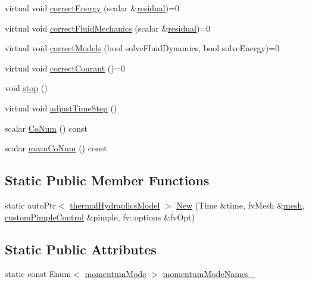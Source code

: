 \begin{DoxyCompactItemize}
\item 
virtual void \hyperlink{classFoam_1_1thermalHydraulicsModel_a58db98bd2888274b7391455494f80703}{correct\+Energy} (scalar \&\hyperlink{solveThermalMechanics_8H_a840cf6bbf9aacf15bd364b478394c3a7}{residual})=0
\item 
virtual void \hyperlink{classFoam_1_1thermalHydraulicsModel_a60d8bd40453510161df9861a9f5e626d}{correct\+Fluid\+Mechanics} (scalar \&\hyperlink{solveThermalMechanics_8H_a840cf6bbf9aacf15bd364b478394c3a7}{residual})=0
\item 
virtual void \hyperlink{classFoam_1_1thermalHydraulicsModel_a10766df44bd24954b638c11c32c5bbe1}{correct\+Models} (bool solve\+Fluid\+Dynamics, bool solve\+Energy)=0
\item 
virtual void \hyperlink{classFoam_1_1thermalHydraulicsModel_a90ec132609df53c542c8e81b7c4b408f}{correct\+Courant} ()=0
\item 
void \hyperlink{classFoam_1_1thermalHydraulicsModel_a8c528baf37154d347366083f0f816846}{stop} ()
\item 
virtual void \hyperlink{classFoam_1_1thermalHydraulicsModel_afa22550c6cc24ef09c5cfa31438da8f1}{adjust\+Time\+Step} ()
\item 
scalar \hyperlink{classFoam_1_1thermalHydraulicsModel_a7a289b1ec4aeedf93652c81703601499}{Co\+Num} () const
\item 
scalar \hyperlink{classFoam_1_1thermalHydraulicsModel_acd5ed72261a128e3736ab35aa025bfb5}{mean\+Co\+Num} () const
\end{DoxyCompactItemize}
\subsection*{Static Public Member Functions}
\begin{DoxyCompactItemize}
\item 
static auto\+Ptr$<$ \hyperlink{classFoam_1_1thermalHydraulicsModel}{thermal\+Hydraulics\+Model} $>$ \hyperlink{classFoam_1_1thermalHydraulicsModel_abdb57d7a02afe89982026d582c0c87c2}{New} (Time \&time, fv\+Mesh \&\hyperlink{createMeshesPostProcess_8H_a8bb1e58291d2d2b653e024a4f4bffe38}{mesh}, \hyperlink{classFoam_1_1customPimpleControl}{custom\+Pimple\+Control} \&pimple, fv\+::options \&fv\+Opt)
\end{DoxyCompactItemize}
\subsection*{Static Public Attributes}
\begin{DoxyCompactItemize}
\item 
static const Enum$<$ \hyperlink{classFoam_1_1thermalHydraulicsModel_a75b783d2202a216abbc0ef52858e2267}{momentum\+Mode} $>$ \hyperlink{classFoam_1_1thermalHydraulicsModel_a0e02db1ed615d7361ee1f583e8f59416}{momentum\+Mode\+Names\+\_\+}
\end{DoxyCompactItemize}
